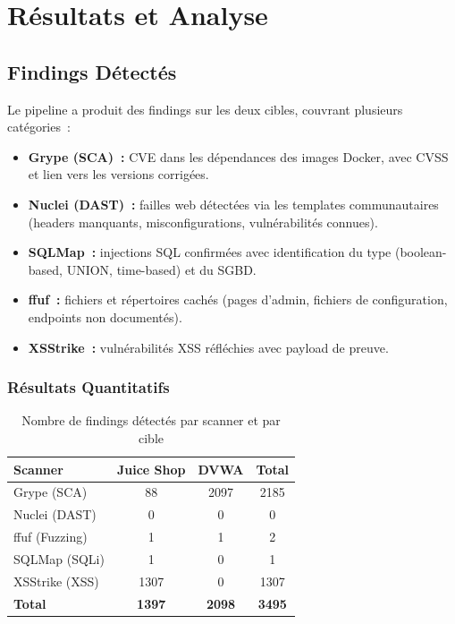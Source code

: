 \documentclass[12pt,a4paper]{report}
\begin{document}
\chapter{Résultats et Analyse}

\section{Findings Détectés}
Le pipeline a produit des findings sur les deux cibles, couvrant plusieurs catégories~:
\begin{itemize}[nosep]
    \item \textbf{Grype (SCA)~:} CVE dans les dépendances des images Docker, avec CVSS et lien vers les versions corrigées.
    \item \textbf{Nuclei (DAST)~:} failles web détectées via les templates communautaires (headers manquants, misconfigurations, vulnérabilités connues).
    \item \textbf{SQLMap~:} injections SQL confirmées avec identification du type (boolean-based, UNION, time-based) et du SGBD.
    \item \textbf{ffuf~:} fichiers et répertoires cachés (pages d'admin, fichiers de configuration, endpoints non documentés).
    \item \textbf{XSStrike~:} vulnérabilités XSS réfléchies avec payload de preuve.
\end{itemize}

\subsection{Résultats Quantitatifs}

\begin{table}[H]
\centering
\caption{Nombre de findings détectés par scanner et par cible}
\small
\begin{tabular}{l c c c}
\toprule
\textbf{Scanner} & \textbf{Juice Shop} & \textbf{DVWA} & \textbf{Total} \\
\midrule
Grype (SCA)    & 88 & 2097 & 2185 \\
Nuclei (DAST)  & 0 & 0 & 0 \\
ffuf (Fuzzing) & 1 & 1 & 2 \\
SQLMap (SQLi)  & 1 & 0 & 1 \\
XSStrike (XSS) & 1307 & 0 & 1307 \\
\midrule
\textbf{Total} & \textbf{1397} & \textbf{2098} & \textbf{3495} \\
\bottomrule
\end{tabular}
\end{table}
\end{document}

